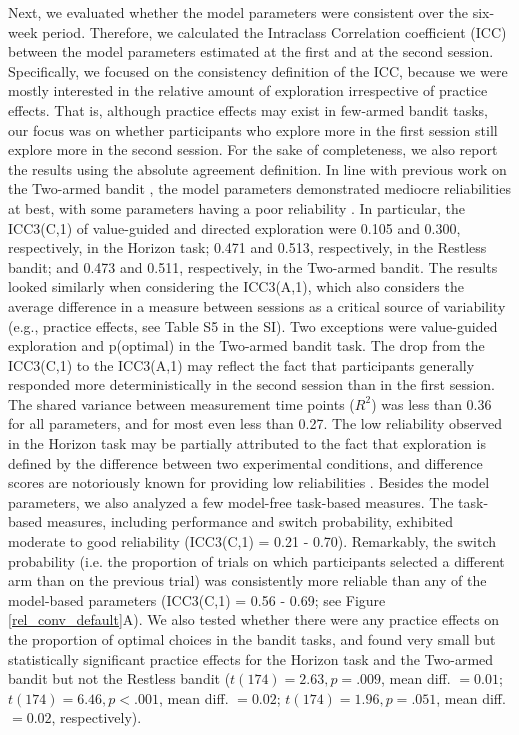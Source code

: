 \documentclass[fleqn,10pt]{wlscirep}
\begin{document}
Next, we evaluated whether the model parameters were consistent over the six-week period. Therefore, we calculated the Intraclass Correlation coefficient (ICC) between the model parameters estimated at the first and at the second session. Specifically, we focused on the consistency definition of the ICC\cite{shrout_intraclass_1979}, because we were mostly interested in the relative amount of exploration irrespective of practice effects. That is, although practice effects may exist in few-armed bandit tasks, our focus was on whether participants who explore more in the first session still explore more in the second session. For the sake of completeness, we also report the results using the absolute agreement definition. In line with previous work on the Two-armed bandit \cite{schurr_dynamic_2024}, the model parameters demonstrated mediocre reliabilities at best, with some parameters having a poor reliability \cite{koo_guideline_2016}. In particular, the ICC3(C,1) of value-guided and directed exploration were 0.105 and 0.300, respectively, in the Horizon task; 0.471 and 0.513, respectively, in the Restless bandit; and 0.473 and 0.511, respectively, in the Two-armed bandit. The results looked similarly when considering the ICC3(A,1), which also considers the average difference in a measure between sessions as a critical source of variability (e.g., practice effects, see Table S5 in the SI). Two exceptions were value-guided exploration and p(optimal) in the Two-armed bandit task. The drop from the ICC3(C,1) to the ICC3(A,1) may reflect the fact that participants generally responded more deterministically in the second session than in the first session. The shared variance between measurement time points ($R^2$) was less than 0.36 for all parameters, and for most even less than 0.27. The low reliability observed in the Horizon task may be partially attributed to the fact that exploration is defined by the difference between two experimental conditions, and difference scores are notoriously known for providing low reliabilities \cite{salthouse_interpreting_2002, hedge_reliability_2018, zorowitz2023improving}. Besides the model parameters, we also analyzed a few model-free task-based measures. The task-based measures, including performance and switch probability, exhibited moderate to good reliability (ICC3(C,1) = 0.21 - 0.70). Remarkably, the switch probability (i.e. the proportion of trials on which participants selected a different arm than on the previous trial) was consistently more reliable than any of the model-based parameters (ICC3(C,1) = 0.56 - 0.69; see Figure \ref{rel_conv_default}A). We also tested whether there were any practice effects on the proportion of optimal choices in the bandit tasks, and found very small but statistically significant practice effects for the Horizon task and the Two-armed bandit but not the Restless bandit ($t(174) = 2.63, p = .009$, mean diff. $= 0.01$; $t(174) = 6.46, p <.001$, mean diff. $= 0.02$; $t(174) = 1.96, p =.051$, mean diff. $= 0.02$, respectively).
\end{document}
